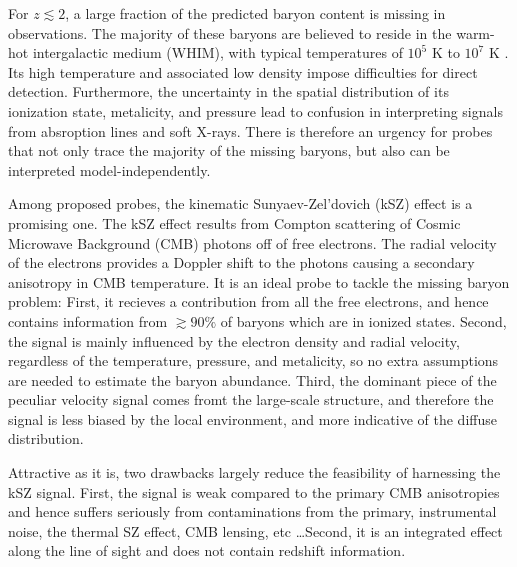 For $z\lesssim 2$, a large fraction of the predicted baryon content is missing in observations. The majority of these baryons are believed to reside in the warm-hot intergalactic medium (WHIM), with typical temperatures of $10^5$ K to $10^7$ K \cite{Pen1999,Soltan06}. Its high temperature and associated low density impose difficulties for direct detection. Furthermore, the uncertainty in the spatial distribution of its ionization state, metalicity, and pressure lead to confusion in interpreting signals from absroption lines and soft X-rays. There is therefore an urgency for probes that not only trace the majority of the missing baryons, but also can be interpreted model-independently.

Among proposed probes, the kinematic Sunyaev-Zel'dovich (kSZ) effect \cite{Sunyaev72,Sunyaev80,Vishniac87} is a promising one. The kSZ effect results from Compton scattering of Cosmic Microwave Background (CMB) photons off of free electrons. The radial velocity of the electrons provides a Doppler shift to the photons causing a secondary anisotropy in CMB temperature. 
It is an ideal probe to tackle the missing baryon problem: First, it recieves a contribution from all the free electrons, 
and hence contains information from $\gtrsim 90\%$ of baryons which are in ionized states. 
%
Second, the signal is mainly influenced by the electron density and radial velocity, regardless of the temperature, pressure, and metalicity, so no extra assumptions are needed to estimate the baryon abundance. Third, the dominant piece of the peculiar velocity signal comes fromt the large-scale structure, and therefore the signal is less biased by the local environment, and more indicative of the diffuse distribution.

Attractive as it is, two drawbacks largely reduce the feasibility of harnessing the kSZ signal. First, the signal is weak compared to the primary CMB anisotropies and hence suffers seriously from contaminations from the primary, instrumental noise, the thermal SZ effect, CMB lensing, etc \dots Second, it is an integrated effect along the line of sight and does not contain redshift information.

